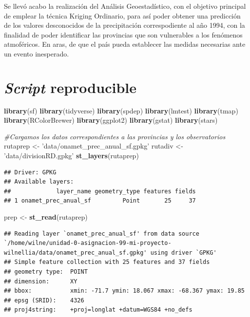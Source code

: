 \documentclass[11pt,]{article}
\newenvironment{Shaded}{\begin{snugshade}}{\end{snugshade}}
\newcommand{\KeywordTok}[1]{\textcolor[rgb]{0.13,0.29,0.53}{\textbf{#1}}}
\newcommand{\StringTok}[1]{\textcolor[rgb]{0.31,0.60,0.02}{#1}}
\newcommand{\CommentTok}[1]{\textcolor[rgb]{0.56,0.35,0.01}{\textit{#1}}}
\newcommand{\NormalTok}[1]{#1}
\begin{document}
Se llevó acabo la realización del Análisis Geoestadístico, con el
objetivo principal de emplear la técnica Kriging Ordinario, para así
poder obtener una predicción de los valores desconocidos de la
precipitación correspodiente al año 1994, con la finalidad de poder
identificar las provincias que son vulnerables a los fenómenos
atmoféricos. En aras, de que el país pueda establecer las medidas
necesarias ante un evento inesperado.

\section{\texorpdfstring{\emph{Script}
reproducible}{Script reproducible}}\label{script-reproducible}

\begin{Shaded}
\begin{Highlighting}[]
\KeywordTok{library}\NormalTok{(sf)}
\KeywordTok{library}\NormalTok{(tidyverse)}
\KeywordTok{library}\NormalTok{(spdep)}
\KeywordTok{library}\NormalTok{(lmtest)}
\KeywordTok{library}\NormalTok{(tmap)}
\KeywordTok{library}\NormalTok{(RColorBrewer)}
\KeywordTok{library}\NormalTok{(ggplot2)}
\KeywordTok{library}\NormalTok{(gstat)}
\KeywordTok{library}\NormalTok{(stars)}

\CommentTok{#Cargamos los datos correspondientes a las provincias y los observatorios}
\NormalTok{rutaprep <-}\StringTok{ 'data/onamet_prec_anual_sf.gpkg'}
\NormalTok{rutadiv <-}\StringTok{ 'data/divisionRD.gpkg'}
\KeywordTok{st_layers}\NormalTok{(rutaprep)}
\end{Highlighting}
\end{Shaded}

\begin{verbatim}
## Driver: GPKG 
## Available layers:
##             layer_name geometry_type features fields
## 1 onamet_prec_anual_sf         Point       25     37
\end{verbatim}

\begin{Shaded}
\begin{Highlighting}[]
\NormalTok{prep <-}\StringTok{ }\KeywordTok{st_read}\NormalTok{(rutaprep)}
\end{Highlighting}
\end{Shaded}

\begin{verbatim}
## Reading layer `onamet_prec_anual_sf' from data source `/home/wilne/unidad-0-asignacion-99-mi-proyecto-wilnellia/data/onamet_prec_anual_sf.gpkg' using driver `GPKG'
## Simple feature collection with 25 features and 37 fields
## geometry type:  POINT
## dimension:      XY
## bbox:           xmin: -71.7 ymin: 18.067 xmax: -68.367 ymax: 19.85
## epsg (SRID):    4326
## proj4string:    +proj=longlat +datum=WGS84 +no_defs
\end{verbatim}
\end{document}
